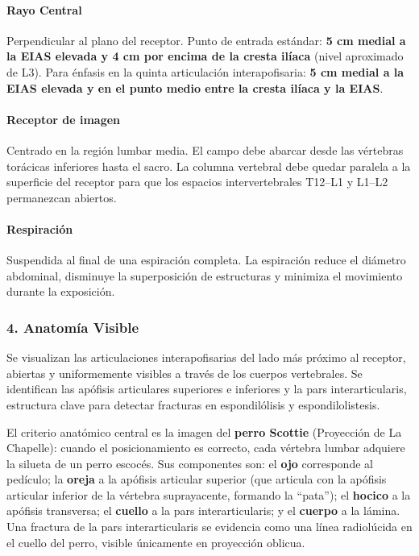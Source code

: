 		\paragraph{Rayo Central}
		Perpendicular al plano del receptor. Punto de entrada estándar: \textbf{5 cm medial a la EIAS elevada y 4 cm por encima de la cresta ilíaca} (nivel aproximado de L3). Para énfasis en la quinta articulación interapofisaria: \textbf{5 cm medial a la EIAS elevada y en el punto medio entre la cresta ilíaca y la EIAS}.
		
		\paragraph{Receptor de imagen}
		Centrado en la región lumbar media. El campo debe abarcar desde las vértebras torácicas inferiores hasta el sacro. La columna vertebral debe quedar paralela a la superficie del receptor para que los espacios intervertebrales T12--L1 y L1--L2 permanezcan abiertos.
		
		\paragraph{Respiración}
		Suspendida al final de una espiración completa. La espiración reduce el diámetro abdominal, disminuye la superposición de estructuras y minimiza el movimiento durante la exposición.
		
		\subsubsection*{4. Anatomía Visible}
		
		Se visualizan las articulaciones interapofisarias del lado más próximo al receptor, abiertas y uniformemente visibles a través de los cuerpos vertebrales. Se identifican las apófisis articulares superiores e inferiores y la pars interarticularis, estructura clave para detectar fracturas en espondilólisis y espondilolistesis.
		
		El criterio anatómico central es la imagen del \textbf{perro Scottie} (Proyección de La Chapelle): cuando el posicionamiento es correcto, cada vértebra lumbar adquiere la silueta de un perro escocés. Sus componentes son: el \textbf{ojo} corresponde al pedículo; la \textbf{oreja} a la apófisis articular superior (que articula con la apófisis articular inferior de la vértebra suprayacente, formando la ``pata''); el \textbf{hocico} a la apófisis transversa; el \textbf{cuello} a la pars interarticularis; y el \textbf{cuerpo} a la lámina. Una fractura de la pars interarticularis se evidencia como una línea radiolúcida en el cuello del perro, visible únicamente en proyección oblicua.
		
